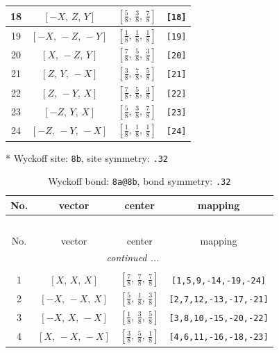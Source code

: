 \documentclass[fleqn,8pt]{jsarticle}
\begin{document}
\begin{longtable}{cccc}
18 & $\left[ - X,\, Z,\, Y \right]$ & $\left[ \frac{5}{8},\, \frac{3}{8},\, \frac{7}{8} \right]$ & {\tt [18]} \\ \hline
19 & $\left[ - X,\, - Z,\, - Y \right]$ & $\left[ \frac{1}{8},\, \frac{1}{8},\, \frac{1}{8} \right]$ & {\tt [19]} \\ \hline
20 & $\left[ X,\, - Z,\, Y \right]$ & $\left[ \frac{7}{8},\, \frac{5}{8},\, \frac{3}{8} \right]$ & {\tt [20]} \\ \hline
21 & $\left[ Z,\, Y,\, - X \right]$ & $\left[ \frac{3}{8},\, \frac{7}{8},\, \frac{5}{8} \right]$ & {\tt [21]} \\ \hline
22 & $\left[ Z,\, - Y,\, X \right]$ & $\left[ \frac{7}{8},\, \frac{5}{8},\, \frac{3}{8} \right]$ & {\tt [22]} \\ \hline
23 & $\left[ - Z,\, Y,\, X \right]$ & $\left[ \frac{5}{8},\, \frac{3}{8},\, \frac{7}{8} \right]$ & {\tt [23]} \\ \hline
24 & $\left[ - Z,\, - Y,\, - X \right]$ & $\left[ \frac{1}{8},\, \frac{1}{8},\, \frac{1}{8} \right]$ & {\tt [24]} \\
\end{longtable}
* Wyckoff site: {\tt 8b}, site symmetry: {\tt .32}
\renewcommand{\arraystretch}{1.2}
\begin{longtable}{cccc}
\caption{Wyckoff bond: {\tt 8a@8b}, bond symmetry: {\tt .32}}
 \\
 \hline \hline
No. & vector & center & mapping \\ \hline \endfirsthead

\multicolumn{3}{l}{\tablename\ \thetable{}} \\
 \hline \hline
No. & vector & center & mapping \\ \hline \endhead

 \hline \hline
\multicolumn{3}{r}{\footnotesize\it continued ...} \\ \endfoot

 \hline \hline
\multicolumn{3}{r}{} \\ \endlastfoot

1 & $\left[ X,\, X,\, X \right]$ & $\left[ \frac{7}{8},\, \frac{7}{8},\, \frac{7}{8} \right]$ & {\tt [1,5,9,-14,-19,-24]} \\ \hline
2 & $\left[ - X,\, - X,\, X \right]$ & $\left[ \frac{5}{8},\, \frac{1}{8},\, \frac{3}{8} \right]$ & {\tt [2,7,12,-13,-17,-21]} \\ \hline
3 & $\left[ - X,\, X,\, - X \right]$ & $\left[ \frac{1}{8},\, \frac{3}{8},\, \frac{5}{8} \right]$ & {\tt [3,8,10,-15,-20,-22]} \\ \hline
4 & $\left[ X,\, - X,\, - X \right]$ & $\left[ \frac{3}{8},\, \frac{5}{8},\, \frac{1}{8} \right]$ & {\tt [4,6,11,-16,-18,-23]} \\
\end{longtable}
\end{document}
